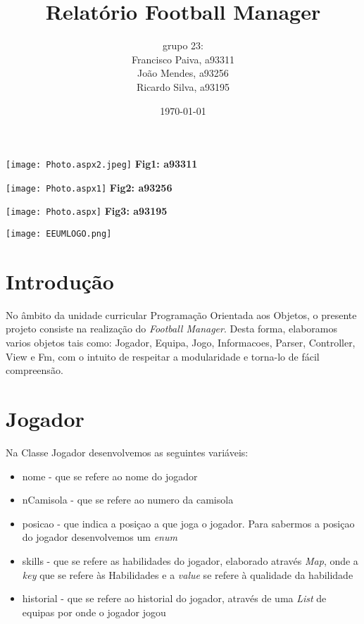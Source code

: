 \documentclass[a4paper,12pt]{article}
\title{Relatório Football Manager}
\author{grupo 23: \\ Francisco Paiva, a93311 \\ João Mendes, a93256 \\ Ricardo Silva, a93195}
\date{\today}
\begin{document}
    \maketitle

    \begin{multicols}{3}
        \texttt{[image: Photo.aspx2.jpeg]}
        \textbf{Fig1: a93311}

        \texttt{[image: Photo.aspx1]}
        \textbf{Fig2: a93256}

        \texttt{[image: Photo.aspx]}
        \textbf{Fig3: a93195}

    \end{multicols}

\begin{center}
    \vspace*{2cm}
    \texttt{[image: EEUMLOGO.png]}
\end{center}

\newpage

\tableofcontents

\setcounter{page}{2}

\newpage

\section{Introdução}
    No âmbito da unidade curricular Programação Orientada aos Objetos, o presente projeto consiste na realização do
\emph{Football Manager}. Desta forma, elaboramos varios objetos tais como: Jogador, Equipa, Jogo, Informacoes, Parser,
Controller, View e Fm, com o intuito de respeitar a modularidade e torna-lo de fácil compreensão.

\section{Jogador}
    Na Classe Jogador desenvolvemos as seguintes variáveis:
    \begin{itemize}
        \item nome - que se refere ao nome do jogador
        \item nCamisola - que se refere ao numero da camisola
        \item posicao - que indica a posiçao a que joga o jogador. Para sabermos a posiçao do jogador desenvolvemos
um \emph{enum}
        \item skills - que se refere as habilidades do jogador, elaborado através \emph{Map}, onde a \emph{key}
que se refere às Habilidades e a \emph{value} se refere à qualidade da habilidade
        \item historial - que se refere ao historial do jogador, através de uma \emph{List} de equipas por onde o
jogador jogou
    \end{itemize}
\end{document}
